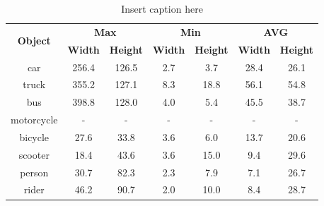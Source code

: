 \begin{table}[h!]
    \centering
    \begin{tabular}{|c|cc|cc|cc|}
        \hline
        \multirow{2}{*}{\textbf{Object}} & \multicolumn{2}{c|}{\textbf{Max}}                     & \multicolumn{2}{c|}{\textbf{Min}}                     & \multicolumn{2}{c|}{\textbf{AVG}}                     \\ \cline{2-7} 
                                        & \multicolumn{1}{c|}{\textbf{Width}} & \textbf{Height} & \multicolumn{1}{c|}{\textbf{Width}} & \textbf{Height} & \multicolumn{1}{c|}{\textbf{Width}} & \textbf{Height} \\ \hline
        car                              & \multicolumn{1}{c|}{256.4}          & 126.5           & \multicolumn{1}{c|}{2.7}            & 3.7             & \multicolumn{1}{c|}{28.4}           & 26.1            \\ \hline
        truck                            & \multicolumn{1}{c|}{355.2}          & 127.1           & \multicolumn{1}{c|}{8.3}            & 18.8            & \multicolumn{1}{c|}{56.1}           & 54.8            \\ \hline
        bus                              & \multicolumn{1}{c|}{398.8}          & 128.0           & \multicolumn{1}{c|}{4.0}            & 5.4             & \multicolumn{1}{c|}{45.5}           & 38.7            \\ \hline
        motorcycle                       & \multicolumn{1}{c|}{-}              & -               & \multicolumn{1}{c|}{-}              & -               & \multicolumn{1}{c|}{-}              & -               \\ \hline
        bicycle                          & \multicolumn{1}{c|}{27.6}           & 33.8            & \multicolumn{1}{c|}{3.6}            & 6.0             & \multicolumn{1}{c|}{13.7}           & 20.6            \\ \hline
        scooter                          & \multicolumn{1}{c|}{18.4}           & 43.6            & \multicolumn{1}{c|}{3.6}            & 15.0            & \multicolumn{1}{c|}{9.4}            & 29.6            \\ \hline
        person                           & \multicolumn{1}{c|}{30.7}           & 82.3            & \multicolumn{1}{c|}{2.3}            & 7.9             & \multicolumn{1}{c|}{7.1}            & 26.7            \\ \hline
        rider                            & \multicolumn{1}{c|}{46.2}           & 90.7            & \multicolumn{1}{c|}{2.0}            & 10.0            & \multicolumn{1}{c|}{8.4}            & 28.7            \\ \hline
    \end{tabular}
    \caption{Insert caption here}
    \label{tab:my-table}
\end{table}

